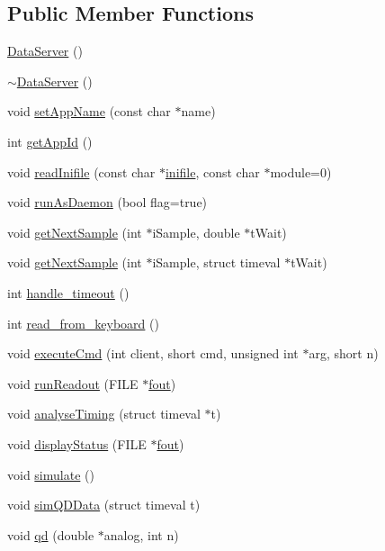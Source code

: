\subsection*{Public Member Functions}
\begin{DoxyCompactItemize}
\item 
\hyperlink{classDataServer_acf71809c4ac2e7eb13d1ad0c6c139b15}{Data\-Server} ()
\item 
\hyperlink{classDataServer_ab4f08bb5349b6b9e021da97db65f1928}{$\sim$\-Data\-Server} ()
\item 
void \hyperlink{classDataServer_aca0d13b666d0a9d17f06b028a4a0f3f6}{set\-App\-Name} (const char $\ast$name)
\item 
int \hyperlink{classDataServer_a9e4b2229d17ab4d8653da5633f243a74}{get\-App\-Id} ()
\item 
void \hyperlink{classDataServer_ab701f76c95c4960824b7c9b587bdcae3}{read\-Inifile} (const char $\ast$\hyperlink{classDataServer_adb52183f12445a883b10c7081fa828a3}{inifile}, const char $\ast$module=0)
\item 
void \hyperlink{classDataServer_a89f7c5443aca4a3f7ed0860d00b0300c}{run\-As\-Daemon} (bool flag=true)
\item 
void \hyperlink{classDataServer_aa625ea002a9ab9b4cfdbb90807a1d67d}{get\-Next\-Sample} (int $\ast$i\-Sample, double $\ast$t\-Wait)
\item 
void \hyperlink{classDataServer_ab9b3333d6a5f872fd5f1e0d8010086a2}{get\-Next\-Sample} (int $\ast$i\-Sample, struct timeval $\ast$t\-Wait)
\item 
int \hyperlink{classDataServer_ac45cfcc0fca260f2283bd563281b4efa}{handle\-\_\-timeout} ()
\item 
int \hyperlink{classDataServer_a0b951c305048d917262e1017b6f7db24}{read\-\_\-from\-\_\-keyboard} ()
\item 
void \hyperlink{classDataServer_a726b0971e705894e243726640ecb7db0}{execute\-Cmd} (int client, short cmd, unsigned int $\ast$arg, short n)
\item 
void \hyperlink{classDataServer_a3977ab6cd0fde850d17c8b04885ad088}{run\-Readout} (F\-I\-L\-E $\ast$\hyperlink{classBaseServer_a9ad43261a042fbeeafee33ca4c0b3fd3}{fout})
\item 
void \hyperlink{classDataServer_a4de71f44e04b81e8d054462e94b087aa}{analyse\-Timing} (struct timeval $\ast$t)
\item 
void \hyperlink{classDataServer_afa17781b543e10b8ecc6f07ab77851f1}{display\-Status} (F\-I\-L\-E $\ast$\hyperlink{classBaseServer_a9ad43261a042fbeeafee33ca4c0b3fd3}{fout})
\item 
void \hyperlink{classDataServer_a0a5c1420e056418d02473db5ca5ec6ba}{simulate} ()
\item 
void \hyperlink{classDataServer_a6d3ab96ddbcf7bf5cff1565dc081b960}{sim\-Q\-D\-Data} (struct timeval t)
\item 
void \hyperlink{classDataServer_aa1e7d4724bbedec466f7c76f549b243b}{qd} (double $\ast$analog, int n)
\end{DoxyCompactItemize}
